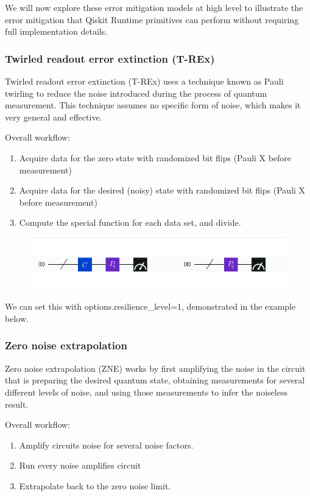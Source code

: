 \documentclass[12pt, oneside]{book}
\theoremstyle{definition}
\theoremstyle{definition}
\theoremstyle{remark}
\begin{document}
We will now explore these error mitigation models at high level to illustrate the error mitigation that Qiskit Runtime primitives can perform without requiring full implementation details. 

\subsubsection{Twirled readout error extinction (T-REx)}
Twirled readout error extinction (T-REx) uses a technique known as Pauli twirling to reduce the noise introduced during the process of quantum measurement. This technique assumes no specific form of noise, which makes it very general and effective.

Overall workflow:
\begin{enumerate}
    \item Acquire data for the zero state with randomized bit flips (Pauli X before measurement)
    \item Acquire data for the desired (noisy) state with randomized bit flips (Pauli X before measurement)
    \item Compute the special function for each data set, and divide.
\end{enumerate}

\begin{figure}[H]
    \centering
    \includegraphics[width=0.75\linewidth]{../images/fig_Trex.png}
\end{figure}
We can set this with options.resilience\_level=1, demonstrated in the example below.

\subsubsection{Zero noise extrapolation}
Zero noise extrapolation (ZNE) works by first amplifying the noise in the circuit that is preparing the desired quantum state, obtaining measurements for several different levels of noise, and using those measurements to infer the noiseless result.

Overall workflow:
\begin{enumerate}
    \item Amplify circuits noise for several noise factors.
    \item Run every noise amplifies circuit
    \item Extrapolate back to the zero noise limit.
\end{enumerate}
\end{document}
